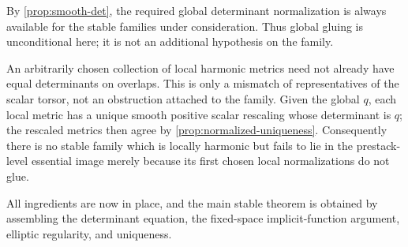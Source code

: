 \documentclass[11pt,reqno]{amsart}
\theoremstyle{definition}
\theoremstyle{remark}
\begin{document}
By \cref{prop:smooth-det}, the required global determinant normalization is always available for the stable families under consideration.  Thus global gluing is unconditional here; it is not an additional hypothesis on the family.

An arbitrarily chosen collection of local harmonic metrics need not already have equal determinants on overlaps.  This is only a mismatch of representatives of the scalar torsor, not an obstruction attached to the family.  Given the global $q$, each local metric has a unique smooth positive scalar rescaling whose determinant is $q$; the rescaled metrics then agree by \cref{prop:normalized-uniqueness}.  Consequently there is no stable family which is locally harmonic but fails to lie in the prestack-level essential image merely because its first chosen local normalizations do not glue.


All ingredients are now in place, and the main stable theorem is obtained by assembling the determinant equation, the fixed-space implicit-function argument, elliptic regularity, and uniqueness.
\end{document}
